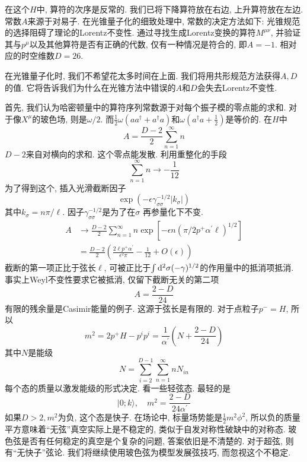 \noindent 在这个$H$中, 算符的次序是反常的. 我们已将下降算符放在右边, 上升算符放在左边. 常数$A$来源于对易子. 在光锥量子化的细致处理中, 常数的决定方法如下: 光锥规范的选择阻碍了理论的Lorentz不变性. 通过寻找生成Lorentz变换的算符$M^{\mu\nu}$, 并验证其与$p^\mu$以及其他算符是否有正确的代数, 仅有一种情况是符合的, 即$A=-1$. 相对应的时空维数$D=26$.

在光锥量子化时, 我们不希望花太多时间在上面. 我们将用共形规范方法获得$A,D$的值. 它将告诉我们为什么在光锥方法中错误的$A$和$D$会失去Lorentz不变性. 

首先, 我们认为哈密顿量中的算符序列常数源于对每个振子模的零点能的求和. 
对于像$X^\mu$的玻色场,  则是$\omega/2$. 而$\frac{1}{2} \omega\left(a a^{\dagger}+a^{\dagger} a\right)$和$\omega\left(a^{\dagger} a+\frac{1}{2}\right)$是等价的. 在$H$中
\begin{equation}
A=\frac{D-2}{2} \sum_{n=1}^{\infty} n
\end{equation}
$D-2$来自对横向的求和. 这个零点能发散. 利用重整化的手段
\begin{equation}
\sum_{n=1}^{\infty} n \rightarrow-\frac{1}{12}
\end{equation}
为了得到这个, 插入光滑截断因子
\begin{equation}
\exp \left(-\epsilon \gamma_{\sigma \sigma}^{-1 / 2}\left|k_{\sigma}\right|\right)
\end{equation}
其中$k_\sigma=n\pi/\ell$. 因子$\gamma_{\sigma\sigma}^{-1/2}$是为了在$\sigma$ 再参量化下不变. 
\begin{equation}
\begin{aligned}
A & \rightarrow \frac{D-2}{2} \sum_{n=1}^{\infty} n \exp \left[-\epsilon n\left(\pi / 2 p^{+} \alpha^{\prime} \ell\right)^{1 / 2}\right] \\
&=\frac{D-2}{2}\left(\frac{2 \ell p^{+} \alpha^{\prime}}{\epsilon^{2} \pi}-\frac{1}{12}+O(\epsilon)\right)
\end{aligned}
\end{equation}
截断的第一项正比于弦长$\ell$, 可被正比于$\int \mathrm{d}^2\sigma(-\gamma)^{1/2}$的作用量中的抵消项抵消. 事实上Weyl不变性要求它被抵消, 仅留下截断无关的第二项
\begin{equation}
A=\frac{2-D}{24}
\end{equation}
有限的残余量是Casimir能量的例子. 这源于弦长是有限的. 对于点粒子$p^-=H$, 所以
\begin{equation}
m^{2}=2 p^{+} H-p^{i} p^{i}=\frac{1}{\alpha^{\prime}}\left(N+\frac{2-D}{24}\right)
\end{equation}
其中$N$是能级
\begin{equation}
N=\sum_{i=2}^{D-1} \sum_{n=1}^{\infty} n N_{i n}
\end{equation}
每个态的质量以激发能级的形式决定. 
看一些轻弦态. 最轻的是
\begin{equation}
|0 ; k\rangle, \quad m^{2}=\frac{2-D}{24 \alpha^{\prime}}
\end{equation}
如果$D>2,m^2$为负, 这个态是快子. 在场论中, 标量场势能是$\frac{1}{2}m^2\phi^2$, 所以负的质量平方意味着``无弦''真空实际上是不稳定的, 类似于自发对称性破缺中的对称态. 玻色弦是否有任何稳定的真空是个复杂的问题, 答案依旧是不清楚的. 对于超弦, 则有``无快子''弦论. 我们将继续使用玻色弦为模型发展弦技巧, 而忽视这个不稳定. 

